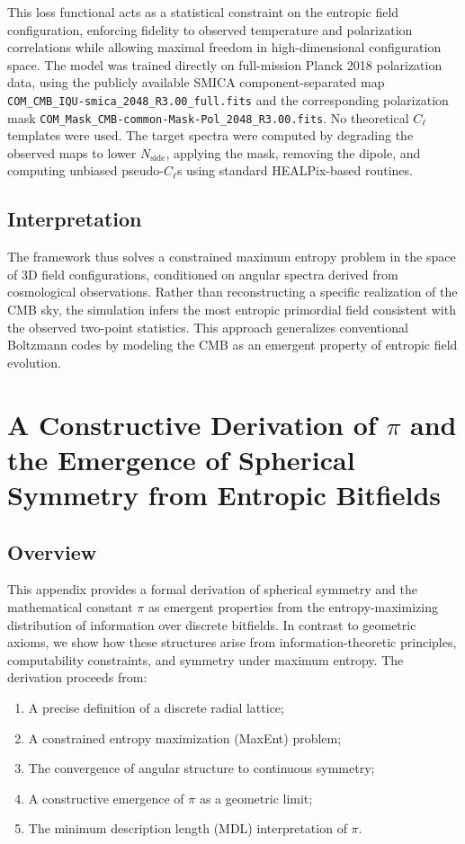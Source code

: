 \documentclass[12pt, a4paper]{article}
\begin{document}
This loss functional acts as a statistical constraint on the entropic field configuration, enforcing fidelity to observed temperature and polarization correlations while allowing maximal freedom in high-dimensional configuration space.
The model was trained directly on full-mission Planck 2018 polarization data, using the publicly available SMICA component-separated map \texttt{COM\_CMB\_IQU-smica\_2048\_R3.00\_full.fits} and the corresponding polarization mask \texttt{COM\_Mask\_CMB-common-Mask-Pol\_2048\_R3.00.fits}. No theoretical \( C_\ell \) templates were used. The target spectra were computed by degrading the observed maps to lower \( N_{\text{side}} \), applying the mask, removing the dipole, and computing unbiased pseudo-\( C_\ell \)s using standard HEALPix-based routines.


\subsection{Interpretation}

The framework thus solves a constrained maximum entropy problem in the space of 3D field configurations, conditioned on angular spectra derived from cosmological observations. Rather than reconstructing a specific realization of the CMB sky, the simulation infers the most entropic primordial field consistent with the observed two-point statistics. This approach generalizes conventional Boltzmann codes by modeling the CMB as an emergent property of entropic field evolution.


\section{A Constructive Derivation of $\pi$ and the Emergence of Spherical Symmetry from Entropic Bitfields}

\subsection{Overview}

This appendix provides a formal derivation of spherical symmetry and the mathematical constant $\pi$ as emergent properties from the entropy-maximizing distribution of information over discrete bitfields. In contrast to geometric axioms, we show how these structures arise from information-theoretic principles, computability constraints, and symmetry under maximum entropy. The derivation proceeds from:

\begin{enumerate}
  \item A precise definition of a discrete radial lattice;
  \item A constrained entropy maximization (MaxEnt) problem;
  \item The convergence of angular structure to continuous symmetry;
  \item A constructive emergence of $\pi$ as a geometric limit;
  \item The minimum description length (MDL) interpretation of $\pi$.
\end{enumerate}
\end{document}
